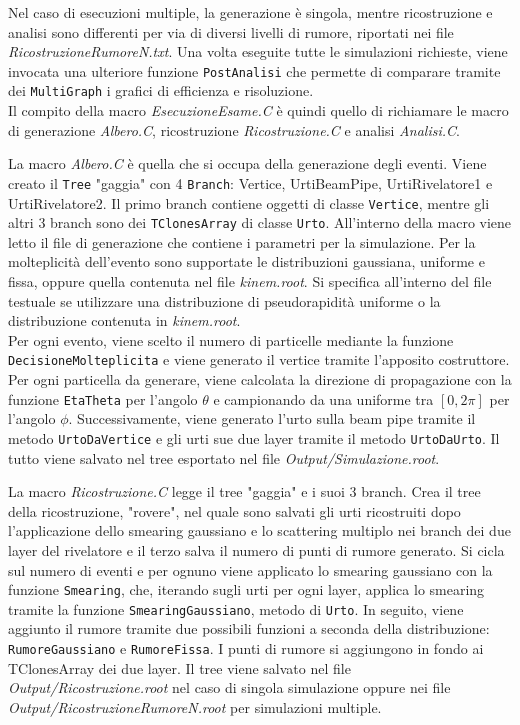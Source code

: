 \documentclass[11pt,a4paper]{article}
\begin{document}
Nel caso di esecuzioni multiple, la generazione è singola, mentre ricostruzione e analisi sono differenti per via di diversi livelli di rumore, riportati nei file \textit{RicostruzioneRumoreN.txt}. Una volta eseguite tutte le simulazioni richieste, viene invocata una ulteriore funzione \lstinline{PostAnalisi} che permette di comparare tramite dei \lstinline{MultiGraph} i grafici di efficienza e risoluzione.\\
Il compito della macro \textit{EsecuzioneEsame.C} è quindi quello di richiamare le macro di generazione \textit{Albero.C}, ricostruzione \textit{Ricostruzione.C} e analisi \textit{Analisi.C}.

La macro \textit{Albero.C} è quella che si occupa della generazione degli eventi. Viene creato il \lstinline{Tree} "gaggia" con 4 \lstinline{Branch}: Vertice, UrtiBeamPipe, UrtiRivelatore1 e UrtiRivelatore2. Il primo branch contiene oggetti di classe \lstinline{Vertice}, mentre gli altri 3 branch sono dei \lstinline{TClonesArray} di classe \lstinline{Urto}. All'interno della macro viene letto il file di generazione che contiene i parametri per la simulazione. Per la molteplicità dell'evento sono supportate le distribuzioni gaussiana, uniforme e fissa, oppure quella contenuta nel file \textit{kinem.root}. Si specifica all'interno del file testuale se utilizzare una distribuzione di pseudorapidità uniforme o la distribuzione contenuta in \textit{kinem.root}.\\
Per ogni evento, viene scelto il numero di particelle mediante la funzione \lstinline{DecisioneMolteplicita} e viene generato il vertice tramite l'apposito costruttore.\\
Per ogni particella da generare, viene calcolata la direzione di propagazione con la funzione \lstinline{EtaTheta} per l'angolo $\theta$ e campionando da una uniforme tra $[0, 2\pi]$ per l'angolo $\phi$. Successivamente, viene generato l'urto sulla beam pipe tramite il metodo \lstinline{UrtoDaVertice} e gli urti sue due layer tramite il metodo \lstinline{UrtoDaUrto}. Il tutto viene salvato nel tree esportato nel file \textit{Output/Simulazione.root}.

La macro \textit{Ricostruzione.C} legge il tree "gaggia" e i suoi 3 branch. Crea il tree della ricostruzione, "rovere", nel quale sono salvati gli urti ricostruiti dopo l'applicazione dello smearing gaussiano e lo scattering multiplo nei branch dei due layer del rivelatore e il terzo salva il numero di punti di rumore generato.
Si cicla sul numero di eventi e per ognuno viene applicato lo smearing gaussiano con la funzione \lstinline{Smearing}, che, iterando sugli urti per ogni layer, applica lo smearing tramite la funzione \lstinline{SmearingGaussiano}, metodo di \lstinline{Urto}. In seguito, viene aggiunto il rumore tramite due possibili funzioni a seconda della distribuzione: \lstinline{RumoreGaussiano} e \lstinline{RumoreFissa}. I punti di rumore si aggiungono in fondo ai TClonesArray dei due layer. Il tree viene salvato nel file \textit{Output/Ricostruzione.root} nel caso di singola simulazione oppure nei file \textit{Output/RicostruzioneRumoreN.root} per simulazioni multiple.
\end{document}
